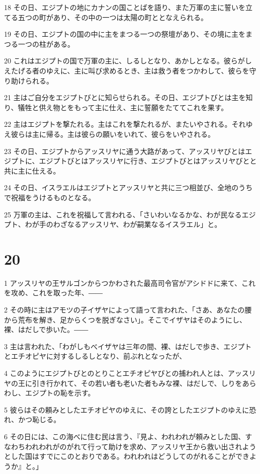 \par 18 その日、エジプトの地にカナンの国ことばを語り、また万軍の主に誓いを立てる五つの町があり、その中の一つは太陽の町ととなえられる。
\par 19 その日、エジプトの国の中に主をまつる一つの祭壇があり、その境に主をまつる一つの柱がある。
\par 20 これはエジプトの国で万軍の主に、しるしとなり、あかしとなる。彼らがしえたげる者のゆえに、主に叫び求めるとき、主は救う者をつかわして、彼らを守り助けられる。
\par 21 主はご自分をエジプトびとに知らせられる。その日、エジプトびとは主を知り、犠牲と供え物とをもって主に仕え、主に誓願をたててこれを果す。
\par 22 主はエジプトを撃たれる。主はこれを撃たれるが、またいやされる。それゆえ彼らは主に帰る。主は彼らの願いをいれて、彼らをいやされる。
\par 23 その日、エジプトからアッスリヤに通う大路があって、アッスリヤびとはエジプトに、エジプトびとはアッスリヤに行き、エジプトびとはアッスリヤびとと共に主に仕える。
\par 24 その日、イスラエルはエジプトとアッスリヤと共に三つ相並び、全地のうちで祝福をうけるものとなる。
\par 25 万軍の主は、これを祝福して言われる、「さいわいなるかな、わが民なるエジプト、わが手のわざなるアッスリヤ、わが嗣業なるイスラエル」と。

\chapter{20}

\par 1 アッスリヤの王サルゴンからつかわされた最高司令官がアシドドに来て、これを攻め、これを取った年、――
\par 2 その時に主はアモツの子イザヤによって語って言われた、「さあ、あなたの腰から荒布を解き、足からくつを脱ぎなさい」。そこでイザヤはそのようにし、裸、はだしで歩いた。――
\par 3 主は言われた、「わがしもべイザヤは三年の間、裸、はだしで歩き、エジプトとエチオピヤに対するしるしとなり、前ぶれとなったが、
\par 4 このようにエジプトびとのとりことエチオピヤびとの捕われ人とは、アッスリヤの王に引き行かれて、その若い者も老いた者もみな裸、はだしで、しりをあらわし、エジプトの恥を示す。
\par 5 彼らはその頼みとしたエチオピヤのゆえに、その誇としたエジプトのゆえに恐れ、かつ恥じる。
\par 6 その日には、この海べに住む民は言う、『見よ、われわれが頼みとした国、すなわちわれわれがのがれて行って助けを求め、アッスリヤ王から救い出されようとした国はすでにこのとおりである。われわれはどうしてのがれることができようか』と。」

